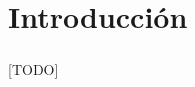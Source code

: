 \documentclass{subfiles}
\begin{document}
  \chapter{Introducción}
  \label{chap:intro}
  
    \paragraph{}
    [TODO]
\end{document}
